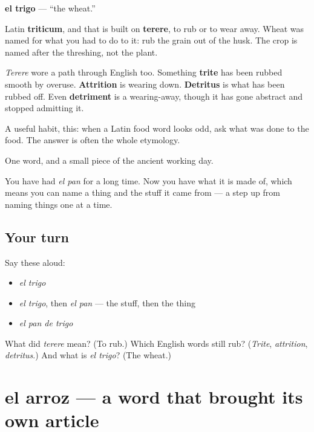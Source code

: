 \begin{cousinweb}
\textbf{el trigo} — \textquotedblleft{}the wheat.\textquotedblright{}

Latin \textbf{triticum}, and that is built on \textbf{terere}, to rub or to wear away. Wheat was named for what you had to do to it: rub the grain out of the husk. The crop is named after the threshing, not the plant.

\emph{Terere} wore a path through English too. Something \textbf{trite} has been rubbed smooth by overuse. \textbf{Attrition} is wearing down. \textbf{Detritus} is what has been rubbed off. Even \textbf{detriment} is a wearing-away, though it has gone abstract and stopped admitting it.

A useful habit, this: when a Latin food word looks odd, ask what was done to the food. The answer is often the whole etymology.
\end{cousinweb}

\begin{grammarlens}[title={What you've built}]
One word, and a small piece of the ancient working day.

You have had \emph{el pan} for a long time. Now you have what it is made of, which means you can name a thing and the stuff it came from — a step up from naming things one at a time.
\end{grammarlens}

\subsection*{Your turn}
Say these aloud:

\begin{itemize}
\raggedright
  \item \emph{el trigo}
  \item \emph{el trigo}, then \emph{el pan} — the stuff, then the thing
  \item \emph{el pan de trigo}
\end{itemize}

\begin{tcolorbox}[breakable,colback=teal!4,colframe=teal!35!black,title={Before you move on}]
What did \emph{terere} mean? (To rub.) Which English words still rub? (\emph{Trite}, \emph{attrition}, \emph{detritus}.) And what is \emph{el trigo}? (The wheat.)
\end{tcolorbox}
\section[el arroz]{el arroz — a word that brought its own article}

